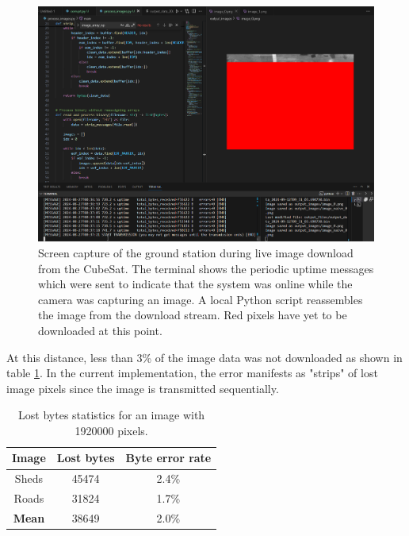 \documentclass{report}
\begin{document}
\begin{figure}[H]
  \centering
  \includegraphics[width=\linewidth]{images/3rd_drone_test_live_reception.png}
  \caption{Screen capture of the ground station during live image download from the CubeSat. The terminal shows the periodic uptime messages which were sent to indicate that the system was online while the camera was capturing an image. A local Python script reassembles the image from the download stream. Red pixels have yet to be downloaded at this point.}
  \label{fig:live-image-reception}
\end{figure}

At this distance, less than 3\% of the image data was not downloaded as shown in table \ref{tabl:image-lost-stats}. In the current implementation, the error manifests as "strips" of lost image pixels since the image is transmitted sequentially.

\begin{table}[H]
  \centering
  \begin{tabular}{|c|c|c|}
    \hline
    \textbf{Image} & \textbf{Lost bytes} & \textbf{Byte error rate} \\\hline
    Sheds          & 45474               & 2.4\%                    \\\hline
    Roads          & 31824               & 1.7\%                    \\\hline
    \textbf{Mean}  & 38649               & 2.0\%                    \\\hline
  \end{tabular}
  \caption{Lost bytes statistics for an image with 1920000 pixels.}
  \label{tabl:image-lost-stats}
\end{table}
\end{document}
